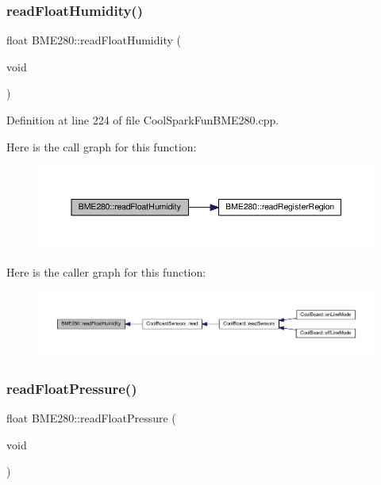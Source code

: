 \subsubsection{\texorpdfstring{read\+Float\+Humidity()}{readFloatHumidity()}}
{\footnotesize\ttfamily float B\+M\+E280\+::read\+Float\+Humidity (\begin{DoxyParamCaption}\item[{void}]{ }\end{DoxyParamCaption})}



Definition at line 224 of file Cool\+Spark\+Fun\+B\+M\+E280.\+cpp.

Here is the call graph for this function\+:
\nopagebreak
\begin{figure}[H]
\begin{center}
\leavevmode
\includegraphics[width=350pt]{class_b_m_e280_a42ea7232039eebf5aadb391ef6132c35_cgraph}
\end{center}
\end{figure}
Here is the caller graph for this function\+:
\nopagebreak
\begin{figure}[H]
\begin{center}
\leavevmode
\includegraphics[width=350pt]{class_b_m_e280_a42ea7232039eebf5aadb391ef6132c35_icgraph}
\end{center}
\end{figure}
\mbox{\label{class_b_m_e280_ada6e799917afb4f228e6253bc56ffe75}} 
\subsubsection{\texorpdfstring{read\+Float\+Pressure()}{readFloatPressure()}}
{\footnotesize\ttfamily float B\+M\+E280\+::read\+Float\+Pressure (\begin{DoxyParamCaption}\item[{void}]{ }\end{DoxyParamCaption})}



